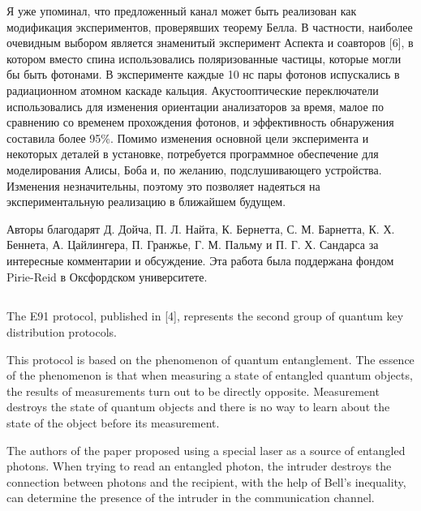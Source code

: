 Я уже упоминал, что предложенный канал может быть реализован как модификация экспериментов, проверявших теорему Белла. В частности, наиболее очевидным выбором является знаменитый эксперимент Аспекта и соавторов [6], в котором вместо спина использовались поляризованные частицы, которые могли бы быть фотонами. В эксперименте каждые 10 нс пары фотонов испускались в радиационном атомном каскаде кальция. Акустооптические переключатели использовались для изменения ориентации анализаторов за время, малое по сравнению со временем прохождения фотонов, и эффективность обнаружения составила более 95\%. Помимо изменения основной цели эксперимента и некоторых деталей в установке, потребуется программное обеспечение для моделирования Алисы, Боба и, по желанию, подслушивающего устройства. Изменения незначительны, поэтому это позволяет надеяться на экспериментальную реализацию в ближайшем будущем.

Авторы благодарят Д. Дойча, П. Л. Найта, К. Бернетта, С. М. Барнетта, К. Х. Беннета, А. Цайлингера, П. Гранжье, Г. М. Пальму и П. Г. Х. Сандарса за интересные комментарии и обсуждение. Эта работа была поддержана фондом Pirie-Reid в Оксфордском университете.


\subsection{\review}
The E91 protocol, published in [4], represents the second group of quantum key distribution protocols.

This protocol is based on the phenomenon of quantum entanglement. The essence of the phenomenon is that when measuring a state of entangled quantum objects, the results of measurements turn out to be directly opposite. Measurement destroys the state of quantum objects and there is no way to learn about the state of the object before its measurement.

The authors of the paper proposed using a special laser as a source of entangled photons. When trying to read an entangled photon, the intruder destroys the connection between photons and the recipient, with the help of Bell's inequality, can determine the presence of the intruder in the communication channel.


\subsection{\dic}
